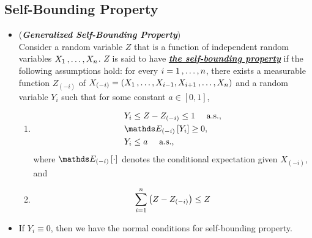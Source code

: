 \documentclass[11pt]{article}
\begin{document}
\subsection{Self-Bounding Property}
\begin{itemize}
\item \begin{definition}(\textbf{\emph{Generalized Self-Bounding Property}})\\
Consider a random variable $Z$ that is a function of independent random variables $X_1 \,{,}\ldots{,}\, X_n$. $Z$ is said to have \underline{\emph{\textbf{the self-bounding property}}} if the following assumptions hold: for every $i = 1 \,{,}\ldots{,}\, n$, there exists a measurable function $Z_{(-i)}$ of $X_{(-i)} = (X_1 \,{,}\ldots{,}\, X_{i-1}, X_{i+1} \,{,}\ldots{,}\, X_{n})$ and a random variable $Y_i$ such that for some constant $a \in [0, 1]$,
\begin{enumerate}
\item \begin{align}
& Y_i \le  Z - Z_{(-i)} \le  1  \quad  \text{ a.s.}, \nonumber\\
 &\E{(-i)}{Y_i} \ge  0, \nonumber\\
&Y_i \le  a \quad  \text{ a.s.}, \label{def: self_bounding_1}
\end{align}
where $\E{(-i)}{\cdot}$ denotes the conditional expectation given $X_{(-i)}$, and

\item 
\begin{align}
\sum_{i=1}^n\left(Z - Z_{(-i)}\right) \le Z\label{def: self_bounding_2}
\end{align}
\end{enumerate} 
\end{definition}

\item \begin{remark}
If $Y_i \equiv 0$, then we have the normal conditions for self-bounding property.
\end{remark}


\end{itemize}
\end{document}

